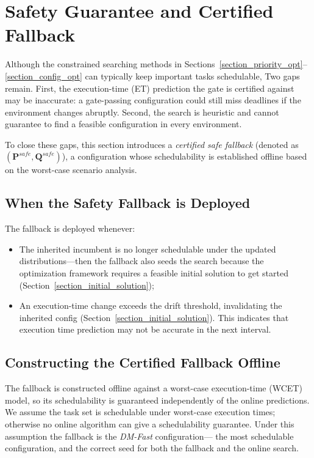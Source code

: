 \section{Safety Guarantee and Certified Fallback}
\label{section_safety_fallback}

    Although the constrained searching methods in Sections~\ref{section_priority_opt}--\ref{section_config_opt}
    can typically keep important tasks schedulable, Two gaps remain.
    First, the execution-time (ET) prediction the gate is certified against may be inaccurate:
    a gate-passing configuration could still miss deadlines if the environment changes abruptly.
    Second, the search is heuristic and cannot guarantee to find a feasible configuration
    in every environment.

    To close these gaps, this section introduces a \emph{certified safe fallback} (denoted as $(\boldsymbol{P}^{safe},\boldsymbol{Q}^{safe})$),
    a configuration whose schedulability is established offline based on the worst-case scenario analysis.

    \subsection{When the Safety Fallback is Deployed}
    \label{section_fallback_triggers}
    The fallback is deployed whenever:
    \begin{itemize}
        \item The inherited incumbent is no longer schedulable under the updated
        distributions---then the fallback also seeds the search because the optimization framework requires a feasible initial solution to get started
        (Section~\ref{section_initial_solution});
        \item An execution-time change exceeds the drift threshold,
        invalidating the inherited config (Section~\ref{section_initial_solution}). 
        This indicates that execution time prediction may not be accurate in the next interval.
    \end{itemize}

    \subsection{Constructing the Certified Fallback Offline}
    \label{section_fallback_construction}
    The fallback is constructed offline against a worst-case execution-time (WCET) model,
    so its schedulability is guaranteed independently of the online predictions.
    We assume the task set is schedulable under worst-case execution times;
    otherwise no online algorithm can give a schedulability guarantee.
    Under this assumption the fallback is the \emph{DM-Fast} configuration---
    the most schedulable configuration, and the correct seed for both the fallback
    and the online search.

